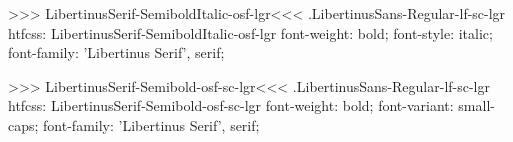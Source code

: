 >>>
\<LibertinusSerif-SemiboldItalic-osf-lgr\><<<
.LibertinusSans-Regular-lf-sc-lgr
htfcss:  LibertinusSerif-SemiboldItalic-osf-lgr  font-weight: bold; font-style: italic; font-family: 'Libertinus Serif', serif;

>>>
\<LibertinusSerif-Semibold-osf-sc-lgr\><<<
.LibertinusSans-Regular-lf-sc-lgr
htfcss:  LibertinusSerif-Semibold-osf-sc-lgr  font-weight: bold; font-variant: small-caps; font-family: 'Libertinus Serif', serif;

